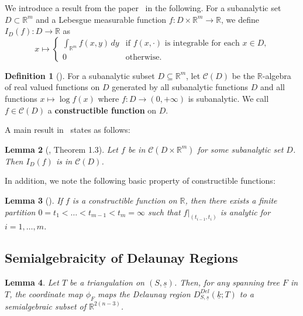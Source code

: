 \documentclass{compositio}
\numberwithin{equation}{section}
\numberwithin{figure}{section}
\theoremstyle{definition}
\newtheorem{definition}{Definition}[section]
\theoremstyle{plain}
\newtheorem{lemma}[definition]{Lemma}
\begin{document}
{We introduce a result from the paper~\cite{intsta} in the following. For a subanalytic set $D\subset\mathbb R^m$ and a Lebesgue measurable function $f:D\times\mathbb{R}^m\to\mathbb{R}$, we define $I_D(f):D\to\mathbb{R}$ as
\begin{equation}\label{equ:defininte}
    x \mapsto
    \begin{cases}    
        \displaystyle\int_{\mathbb{R}^m} f(x, y) \, dy & \text{if $f(x, \cdot)$ is integrable for each $x \in D$,} \\[8pt]
        0 & \text{otherwise.}
    \end{cases}
\end{equation}

\begin{definition}[{\cite[Definition~1.2]{intsta}}]
    For a subanalytic subset $D\subseteq \mathbb{R}^m$, let $\mathcal{C}(D)$ be the $\mathbb{R}$-algebra of real valued functions on $D$ generated by all subanalytic functions $D$ and all functions $x\mapsto \log f(x)$ where $f:D\to(0,+\infty)$ is subanalytic. We call $f\in \mathcal{C}(D)$ a \textbf{constructible function} on $D$.    
\end{definition}

A main result in~\cite{intsta} states as follows:
\begin{lemma}[\cite{intsta}, Theorem 1.3]\label{lem:constructible}
    Let $f$ be in $\mathcal{C}(D\times\mathbb{R}^m)$ for some subanalytic set $D$. Then $I_D(f)$ is in $\mathcal{C}(D)$.
\end{lemma}

In addition, we note the following basic property of constructible functions:
\begin{lemma}[{\cite[Section 4]{DMM}}]\label{lem:piecewiseanaly}
    If $f$ is a constructible function on $\mathbb{R}$, then there exists a finite partition $0 = t_1 < \ldots < t_{m-1} < t_m = \infty$ such that $f|_{(t_{i-1}, t_i)}$ is analytic for $i = 1,\ldots,m$.
\end{lemma}

\subsection{Semialgebraicity of Delaunay Regions}

\begin{lemma}\label{lem:delaunaychart}
Let $T$ be a triangulation on $(S,\underline{s})$.
Then, for any spanning tree $F$ in $T$, the coordinate map $\phi_F$ maps the Delaunay region $D_{S,\underline{s}}^{Del}(\underline{k};T)$ to a semialgebraic subset of $\mathbb{R}^{2(n-3)}$. 
\end{lemma}

}
\end{document}
